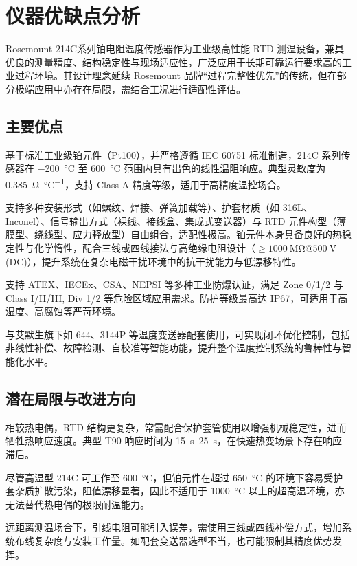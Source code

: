 \section{仪器优缺点分析}

Rosemount 214C系列铂电阻温度传感器作为工业级高性能 RTD 测温设备，兼具优良的测量精度、结构稳定性与现场适应性，广泛应用于长期可靠运行要求高的工业过程环境。其设计理念延续 Rosemount 品牌“过程完整性优先”的传统，但在部分极端应用中亦存在局限，需结合工况进行适配性评估。

\subsection{主要优点}
  
基于标准工业级铂元件（Pt100），并严格遵循 IEC 60751 标准制造，214C 系列传感器在 \SI{-200}{\degreeCelsius} 至 \SI{+600}{\degreeCelsius} 范围内具有出色的线性温阻响应。典型灵敏度为 \SI{0.385}{\ohm\per\celsius}，支持 Class A 精度等级，适用于高精度温控场合。

支持多种安装形式（如螺纹、焊接、弹簧加载等）、护套材质（如 316L、Inconel）、信号输出方式（裸线、接线盒、集成式变送器）与 RTD 元件构型（薄膜型、绕线型、应力释放型）自由组合，适配性极高。铂元件本身具备良好的热稳定性与化学惰性，配合三线或四线接法与高绝缘电阻设计（$\geq \SI{1000}{\mega\ohm} @ \SI{500}{\volt}$(DC)），提升系统在复杂电磁干扰环境中的抗干扰能力与低漂移特性。

支持 ATEX、IECEx、CSA、NEPSI 等多种工业防爆认证，满足 Zone 0/1/2 与 Class I/II/III, Div 1/2 等危险区域应用需求。防护等级最高达 IP67，可适用于高湿度、高腐蚀等严苛环境。

与艾默生旗下如 644、3144P 等温度变送器配套使用，可实现闭环优化控制，包括非线性补偿、故障检测、自校准等智能功能，提升整个温度控制系统的鲁棒性与智能化水平。

\subsection{潜在局限与改进方向}

相较热电偶，RTD 结构更复杂，常需配合保护套管使用以增强机械稳定性，进而牺牲热响应速度。典型 T90 响应时间为 \SIrange{15}{25}{\second}，在快速热变场景下存在响应滞后。

尽管高温型 214C 可工作至 \SI{+600}{\degreeCelsius}，但铂元件在超过 \SI{650}{\degreeCelsius} 的环境下容易受护套杂质扩散污染，阻值漂移显著，因此不适用于 \SI{1000}{\degreeCelsius} 以上的超高温环境，亦无法替代热电偶的极限耐温能力。

远距离测温场合下，引线电阻可能引入误差，需使用三线或四线补偿方式，增加系统布线复杂度与安装工作量。如配套变送器选型不当，也可能限制其精度优势发挥。

